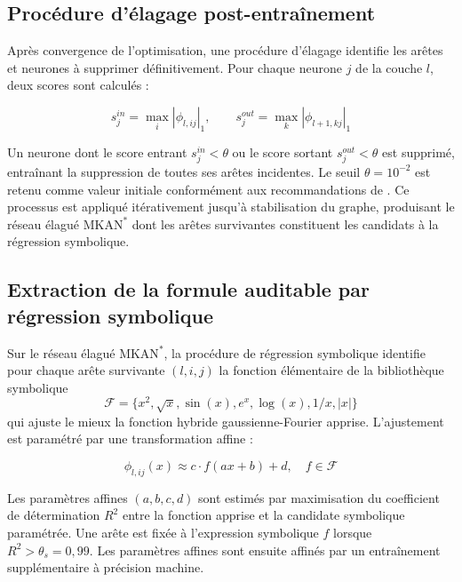 \documentclass[11pt,a4paper,oneside]{report}
\theoremstyle{definition}
\theoremstyle{remark}
\begin{document}
\subsection{Procédure d'élagage post-entraînement}
\label{subsubsec:elagage-post-entrainement}

Après convergence de l'optimisation, une procédure d'élagage identifie les arêtes et neurones à supprimer définitivement. Pour chaque neurone $j$ de la couche $l$, deux scores sont calculés :

\begin{equation}
s_j^{in} = \max_i |\phi_{l,ij}|_1, \qquad s_j^{out} = \max_k |\phi_{l+1,kj}|_1
\label{eq:scores-elagage}
\end{equation}

Un neurone dont le score entrant $s_j^{in} < \theta$ ou le score sortant $s_j^{out} < \theta$ est supprimé, entraînant la suppression de toutes ses arêtes incidentes. Le seuil $\theta = 10^{-2}$ est retenu comme valeur initiale conformément aux recommandations de \citet{liu2024kan}. Ce processus est appliqué itérativement jusqu'à stabilisation du graphe, produisant le réseau élagué $\text{MKAN}^*$ dont les arêtes survivantes constituent les candidats à la régression symbolique.

\subsection{Extraction de la formule auditable par régression symbolique}
\label{subsubsec:extraction-formule-symbolique}

Sur le réseau élagué $\text{MKAN}^*$, la procédure de régression symbolique identifie pour chaque arête survivante $(l,i,j)$ la fonction élémentaire de la bibliothèque symbolique
\[
\mathcal{F} = \{x^2, \sqrt{x}, \sin(x), e^x, \log(x), 1/x, |x|\}
\]
qui ajuste le mieux la fonction hybride gaussienne-Fourier apprise. L'ajustement est paramétré par une transformation affine :

\begin{equation}
\phi_{l,ij}(x) \approx c \cdot f(ax + b) + d, \quad f \in \mathcal{F}
\label{eq:ajustement-affine-symbolique}
\end{equation}

Les paramètres affines $(a, b, c, d)$ sont estimés par maximisation du coefficient de détermination $R^2$ entre la fonction apprise et la candidate symbolique paramétrée. Une arête est fixée à l'expression symbolique $f$ lorsque $R^2 > \theta_s = 0{,}99$. Les paramètres affines sont ensuite affinés par un entraînement supplémentaire à précision machine.
\end{document}
